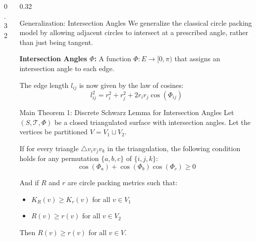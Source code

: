 \documentclass[final]{beamer}
\begin{document}
\begin{frame}[t]
\begin{columns}[T]
\begin{column}{0.32\linewidth}
        \end{column}

        \begin{column}{0.32\linewidth}

            \begin{block}{Generalization: Intersection Angles}
                We generalize the classical circle packing model by allowing adjacent circles to intersect at a prescribed angle, rather than just being tangent.
                \vspace{1em}

                \textbf{Intersection Angles $\Phi$:} A function $\Phi: E \to [0, \pi)$ that assigns an intersection angle to each edge.
                \vspace{1em}

                The edge length $l_{ij}$ is now given by the law of cosines:
                $$ l_{ij}^2 = r_i^2 + r_j^2 + 2r_i r_j \cos(\Phi_{ij}) $$
            \end{block}

            \begin{alertblock}{Main Theorem 1: Discrete Schwarz Lemma for Intersection Angles}
                Let $(S, \mathcal{T}, \Phi)$ be a closed triangulated surface with intersection angles. Let the vertices be partitioned $V = V_1 \sqcup V_2$.
                \vspace{1em}

                If for every triangle $\triangle v_i v_j v_k$ in the triangulation, the following condition holds for any permutation $\{a, b, c\}$ of $\{i, j, k\}$:
                $$ \cos(\Phi_a) + \cos(\Phi_b)\cos(\Phi_c) \ge 0 $$
                \vspace{1em}

                And if $R$ and $r$ are circle packing metrics such that:
                \begin{itemize}
                    \item $K_R(v) \ge K_r(v)$ for all $v \in V_1$
                    \item $R(v) \ge r(v)$ for all $v \in V_2$
                \end{itemize}
                Then $R(v) \ge r(v)$ for all $v \in V$.
            \end{alertblock}


\end{column}
\end{columns}
\end{frame}
\end{document}
